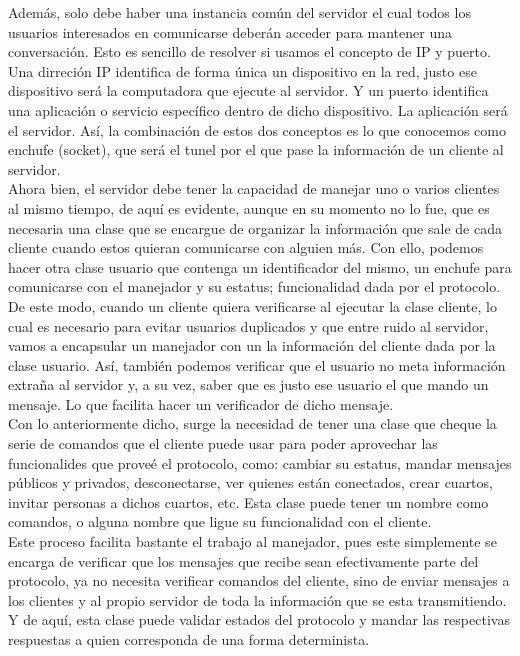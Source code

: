 \documentclass{article}
\begin{document}
Además, solo debe haber una instancia común del servidor el cual todos los usuarios interesados en comunicarse deberán acceder para mantener una conversación. Esto es sencillo de resolver si usamos el concepto de IP y puerto. Una dirreción IP identifica de forma única un dispositivo en la red, justo ese dispositivo será la computadora que ejecute al servidor. Y un puerto identifica una aplicación o servicio específico dentro de dicho dispositivo. La aplicación será el servidor. Así, la combinación de estos dos conceptos es lo que conocemos como enchufe (socket), que será el tunel por el que pase la información de un cliente al servidor.\\

Ahora bien, el servidor debe tener la capacidad de manejar uno o varios clientes al mismo tiempo, de aquí es evidente, aunque en su momento no lo fue, que es necesaria una clase que se encargue de organizar la información que sale de cada cliente cuando estos quieran comunicarse con alguien más. Con ello, podemos hacer otra clase usuario que contenga un identificador del mismo, un enchufe para comunicarse con el manejador y su estatus; funcionalidad dada por el protocolo.\\

De este modo, cuando un cliente quiera verificarse al ejecutar la clase cliente, lo cual es necesario para evitar usuarios duplicados y que entre ruido al servidor, vamos a encapsular un manejador con un la información del cliente dada por la clase usuario. Así, también podemos verificar que el usuario no meta información extraña al servidor y, a su vez, saber que es justo ese usuario el que mando un mensaje. Lo que facilita hacer un verificador de dicho mensaje.\\

Con lo anteriormente dicho, surge la necesidad de tener una clase que cheque la serie de comandos que el cliente puede usar para poder aprovechar las funcionalides que proveé el protocolo, como: cambiar su estatus, mandar mensajes públicos y privados, desconectarse, ver quienes están conectados, crear cuartos, invitar personas a dichos cuartos, etc. Esta clase puede tener un nombre como comandos, o alguna nombre que ligue su funcionalidad con el cliente.\\

Este proceso facilita bastante el trabajo al manejador, pues este simplemente se encarga de verificar que los mensajes que recibe sean efectivamente parte del protocolo, ya no necesita verificar comandos del cliente, sino de enviar mensajes a los clientes y al propio servidor de toda la información que se esta transmitiendo. Y de aquí, esta clase puede validar estados del protocolo y mandar las respectivas respuestas a quien corresponda de una forma determinista. \\
\end{document}

